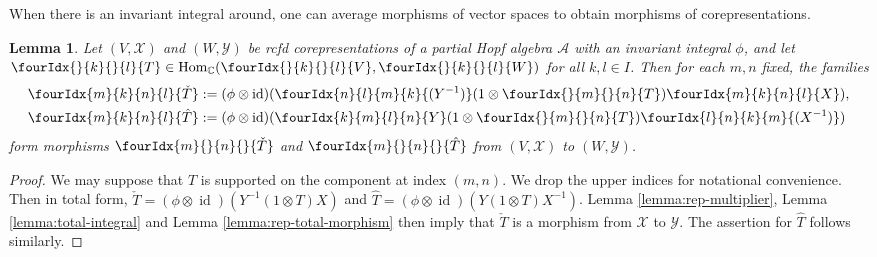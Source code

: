 \documentclass[10pt]{article}
\DeclareMathOperator{\id}{id}
\DeclareMathOperator{\Hom}{Hom}
\newcommand{\C}{\mathbb{C}}
\newcommand{\Gr}[5]{\fourIdx{#2}{#4}{#3}{#5}{#1}}%
\newcommand{\Gru}[3]{\Gr{#1}{}{}{#2}{#3}}
\newcommand{\Grd}[3]{\Gr{#1}{#2}{#3}{}{}}
\newtheorem{Lem}[Theorem]{Lemma}
\theoremstyle{definition}
\numberwithin{equation}{section}
\begin{document}
When there is an invariant integral around, one can average morphisms of vector spaces to obtain morphisms of corepresentations. 
\begin{Lem} \label{lem:rep-average}  Let $(V,\mathscr{X})$ and
  $(W,\mathscr{Y})$ be rcfd corepresentations of  a partial
  Hopf algebra $\mathscr{A}$ with an invariant integral $\phi$, and let
  $\Gru{T}{k}{l} \in \Hom_{\C}(\Gru{V}{k}{l},\Gru{W}{k}{l})$ for all $k,l\in I$. Then for each $m,n$ fixed, the families
  \begin{align*}
    \Gr{\check T}{m}{n}{k}{l} &:= (\phi \otimes
    \id)(\Gr{(Y^{-1})}{n}{m}{l}{k}(1\otimes
    \Gru{T}{m}{n})\Gr{X}{m}{n}{k}{l}), \\
    \Gr{\hat T}{m}{n}{k}{l} &:=(\phi \otimes
    \id)(\Gr{Y}{k}{l}{m}{n}(1\otimes
    \Gru{T}{m}{n})\Gr{(X^{-1})}{l}{k}{n}{m})
  \end{align*} %
form  morphisms $\Grd{\check{T}}{m}{n}$ and $\Grd{\hat{T}}{m}{n}$ from $(V,\mathscr{X})$ to $(W,\mathscr{Y})$. 
\end{Lem} 
\begin{proof} We may suppose that $T$ is supported on the component at index $(m,n)$. We drop the upper indices for notational convenience. Then 
 in total form, $\check{T}=(\phi \otimes \id)(Y^{-1}(1 \otimes T)X)$
  and $\hat{T}=(\phi \otimes \id)(Y(1 \otimes T)X^{-1})$.  Lemma
  \ref{lemma:rep-multiplier}, Lemma \ref{lemma:total-integral} and Lemma \ref{lemma:rep-total-morphism}
 then imply that $\check{T}$ is a morphism from $\mathscr{X}$ to $\mathscr{Y}$. The assertion for $\hat
  T$ follows similarly.
\end{proof}
\end{document}
